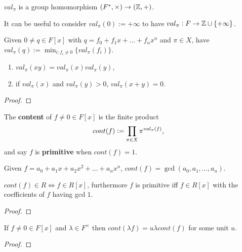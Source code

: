 \documentclass{report}
\begin{document}
\begin{proposition}
    $val_\pi$ is a group homomorphism $(F^*,\times)\rightarrow(\mathbb{Z},+)$.
\end{proposition}

\begin{remark}
    It can be useful to consider $val_\pi(0):=+\infty$ to have $val_\pi:F\rightarrow\mathbb{Z}\cup\{+\infty\}$.
\end{remark}

\begin{definition}
    Given $0\neq q\in F[x]$ with $q=f_0+f_1x+\ldots+f_nx^n$ and $\pi\in X$, have $\displaystyle val_\pi(q):=\min_{i:f_i\neq0}\{val_\pi(f_i)\}$.
\end{definition}

\begin{lemma}
    \begin{enumerate}
        \item $val_\pi(xy)=val_\pi(x)val_\pi(y)$,
        \item if $val_\pi(x)$ and $val_\pi(y)>0$, $val_\pi(x+y)=0$.
    \end{enumerate}\begin{proof}
        
    \end{proof}
\end{lemma}

\begin{definition}[Content]
    The \textbf{content} of $f\neq0\in F[x]$ is the finite product \[
        cont(f):=\prod_{\pi\in X}\pi^{val_\pi(f)}\text{\textcolor{black}{,}}
    \] and say $f$ is \textbf{primitive} when $cont(f)=1$.
\end{definition}

\begin{remark}
    Given $f=a_0+a_1 x + a_2 x^2 + \ldots + a_n x^n$, $cont(f)=\gcd(a_0,a_1,\ldots,a_n)$.
\end{remark}

\begin{lemma}
    $cont(f)\in R \iff f\in R[x]$, furthermore $f$ is primitive iff $f\in R[x]$ with the coefficients of $f$ having gcd $1$. \begin{proof}
        
    \end{proof}
\end{lemma}

\begin{lemma}
    If $f\neq 0\in F[x]$ and $\lambda\in F^\times$ then $cont(\lambda f)=u\lambda cont(f)$ for some unit $u$. \begin{proof}
        
    \end{proof}
\end{lemma}
\end{document}
